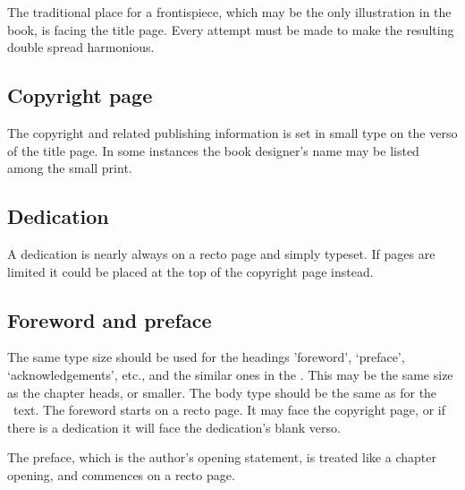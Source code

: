 \documentclass[10pt,a4paper,oneside,extrafontsizes]{memoir}%
\begin{document}
\begin{paracol}{2}
\switchEng
    The traditional place for a frontispiece, 
which may be the only
illustration in the book, is facing the title page. Every attempt must be
made to make the resulting double spread harmonious.
\end{paracol}

\subsection{Copyright page}

\begin{paracol}{2}
\switchEng
    The copyright and related publishing 
information is set in small type
on the verso of the title page. In some instances the book designer's name may
be listed among the small print.
\end{paracol}

\subsection{Dedication}

\begin{paracol}{2}
\switchEng
    A dedication is nearly always on a recto page and 
simply typeset. If 
pages are limited it could be placed at the top of the copyright 
page instead.
\end{paracol}

\subsection{Foreword and preface}

\begin{paracol}{2}
\switchEng
    The same type size should be used for the headings 'foreword', `preface',
`acknowledgements', etc., and the similar ones in the \pixbackmatter. This
may be the same size as the chapter heads, or smaller. The body type should be
the same as for the \pixmainmatter\ text.
The foreword starts on a recto page. It may face the 
copyright page, or if 
there is a dedication it will face the dedication's 
blank verso.

    The preface, which is the author's opening statement, 
is treated like a chapter opening, and commences on a recto page.
\end{paracol}
\end{document}
